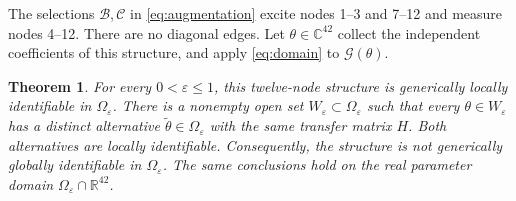 \documentclass[letterpaper,10pt,conference]{ieeeconf}
\newtheorem{theorem}{Theorem}
\begin{document}
The selections \(\mathcal B,\mathcal C\) in \eqref{eq:augmentation}
excite nodes 1--3 and 7--12 and measure nodes 4--12.
There are no diagonal edges.
Let \(\theta\in\mathbb C^{42}\) collect the independent coefficients
of this structure, and apply \eqref{eq:domain} to \(\mathcal G(\theta)\).

\begin{theorem}\label{thm:main}
For every \(0<\varepsilon\le1\), this twelve-node structure is
generically locally identifiable in \(\Omega_\varepsilon\).
There is a nonempty open set \(W_\varepsilon\subset\Omega_\varepsilon\)
such that every \(\theta\in W_\varepsilon\) has a distinct alternative
\(\widetilde\theta\in\Omega_\varepsilon\) with the same transfer matrix \(H\).
Both alternatives are locally identifiable. Consequently, the structure
is not generically globally identifiable in \(\Omega_\varepsilon\).
The same conclusions hold on the real parameter domain
\(\Omega_\varepsilon\cap\mathbb R^{42}\).
\end{theorem}
\end{document}
